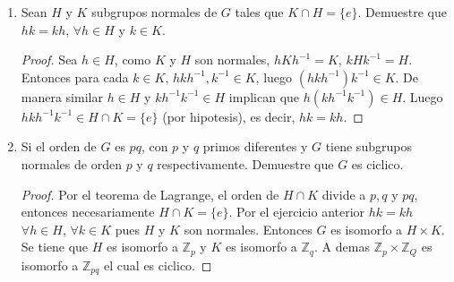 \documentclass{article}
\theoremstyle{break}
\begin{document}
\begin{enumerate}
\begin{proof}
			Considere el conjugado de $<x>$, dicho subgrupo es ciclico y tiene orden $k$, entonces todos sus elementos saisfacen $z^k=e$, esto sgnifica que tanto $<x>$ como $<y>$ son normales.
			
			Caso 1: $(m,k)=1.$
			
			En este caso tenemos que $<x>\cap <y>=\{e\}$, $|xy|=[k,m]$ y  en general, $[k,m]\geq k$ para cualquier $m$. Como $k$ es el orden maximo, entonces $[k,m]=k$. A demas $xy\notin <x>$ pues de ser cierto esto implicaria que $y\in <x>$. Entonces tenemos otra solucion para $z^n=e$ lo cual es una contradiccion.
			
			Caso 2: $(m,k)>1$
			
			Sea $d=[m,k]$. Considereel elemento $y^{m/d}$. este tiene orden $d$ y $d\leq m$. entonces $y^{m/d}$ tiene orden menor o igual a $y$, pero como $m$ fue tomado como minimo, tenemos que $m=d$, esto implica que $m|k$. Pero esto implica que $y^k=e$ y esto es otra solucion para $z^k=e$ lo cual es una contradiccion.
			
			Se concluye asi que $k=n$ entonces $G$ es ciclico.
		\end{proof}
		
		\item Sean $H$ y $K$ subgrupos normales de $G$ tales que $K\cap H=\{e\}$. Demuestre que $hk=kh$, $\forall h\in H$ y $k\in K$.
		
		\begin{proof}
			Sea $h\in H$, como $K$ y $H$ son normales, $hKh^{-1}=K$, $kHk^{-1}=H$. Entonces para cada $k\in K$, $hkh^{-1}, k^{-1}\in K$, luego $(hkh^{-1})k^{-1}\in K$. De manera similar $h\in H$ y $kh^{-1}k^{-1}\in H$ implican que $h(kh^{-1}k^{-1})\in H$. Luego $hkh^{-1}k^{-1}\in H\cap K=\{e\}$ (por hipotesis), es decir, $hk=kh$.
		\end{proof}
		
		\item 	Si el orden de $G$ es $pq$, con $p$ y $q$ primos diferentes y $G$ tiene subgrupos normales de orden $p$ y $q$ respectivamente. Demuestre que $G$ es ciclico.
		
		\begin{proof}
			Por el teorema de Lagrange, el orden de $H\cap K$ divide a $p, q$ y $pq$, entonces necesariamente $H\cap K=\{e\}$. Por el ejercicio anterior $hk=kh$ $\forall h\in H$, $\forall k\in K$ pues $H$ y $K$ son normales. Entonces $G$ es isomorfo a $H\times K$. Se tiene que $H$ es isomorfo a $\mathbb{Z}_p$ y $K$ es isomorfo a $\mathbb{Z}_q$. A demas $\mathbb{Z}_p\times\mathbb{Z}_Q$ es isomorfo a $\mathbb{Z}_{pq}$ el cual es ciclico.
		\end{proof}
		

\end{enumerate}
\end{document}
